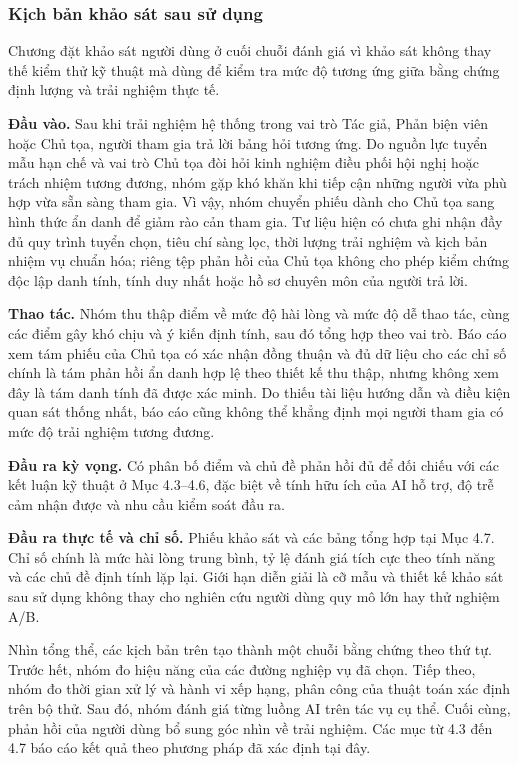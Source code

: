 \subsubsection{Kịch bản khảo sát sau sử dụng}

Chương đặt khảo sát người dùng ở cuối chuỗi đánh giá vì khảo sát không thay thế kiểm thử kỹ thuật mà dùng để kiểm tra mức độ tương ứng giữa bằng chứng định lượng và trải nghiệm thực tế.

\textbf{Đầu vào.} Sau khi trải nghiệm hệ thống trong vai trò Tác giả, Phản biện viên hoặc Chủ tọa, người tham gia trả lời bảng hỏi tương ứng. Do nguồn lực tuyển mẫu hạn chế và vai trò Chủ tọa đòi hỏi kinh nghiệm điều phối hội nghị hoặc trách nhiệm tương đương, nhóm gặp khó khăn khi tiếp cận những người vừa phù hợp vừa sẵn sàng tham gia. Vì vậy, nhóm chuyển phiếu dành cho Chủ tọa sang hình thức ẩn danh để giảm rào cản tham gia. Tư liệu hiện có chưa ghi nhận đầy đủ quy trình tuyển chọn, tiêu chí sàng lọc, thời lượng trải nghiệm và kịch bản nhiệm vụ chuẩn hóa; riêng tệp phản hồi của Chủ tọa không cho phép kiểm chứng độc lập danh tính, tính duy nhất hoặc hồ sơ chuyên môn của người trả lời.

\textbf{Thao tác.} Nhóm thu thập điểm về mức độ hài lòng và mức độ dễ thao tác, cùng các điểm gây khó chịu và ý kiến định tính, sau đó tổng hợp theo vai trò. Báo cáo xem tám phiếu của Chủ tọa có xác nhận đồng thuận và đủ dữ liệu cho các chỉ số chính là tám phản hồi ẩn danh hợp lệ theo thiết kế thu thập, nhưng không xem đây là tám danh tính đã được xác minh. Do thiếu tài liệu hướng dẫn và điều kiện quan sát thống nhất, báo cáo cũng không thể khẳng định mọi người tham gia có mức độ trải nghiệm tương đương.

\textbf{Đầu ra kỳ vọng.} Có phân bố điểm và chủ đề phản hồi đủ để đối chiếu với các kết luận kỹ thuật ở Mục 4.3--4.6, đặc biệt về tính hữu ích của AI hỗ trợ, độ trễ cảm nhận được và nhu cầu kiểm soát đầu ra.

\textbf{Đầu ra thực tế và chỉ số.} Phiếu khảo sát và các bảng tổng hợp tại Mục 4.7. Chỉ số chính là mức hài lòng trung bình, tỷ lệ đánh giá tích cực theo tính năng và các chủ đề định tính lặp lại. Giới hạn diễn giải là cỡ mẫu và thiết kế khảo sát sau sử dụng không thay cho nghiên cứu người dùng quy mô lớn hay thử nghiệm A/B.

Nhìn tổng thể, các kịch bản trên tạo thành một chuỗi bằng chứng theo thứ tự. Trước hết, nhóm đo hiệu năng của các đường nghiệp vụ đã chọn. Tiếp theo, nhóm đo thời gian xử lý và hành vi xếp hạng, phân công của thuật toán xác định trên bộ thử. Sau đó, nhóm đánh giá từng luồng AI trên tác vụ cụ thể. Cuối cùng, phản hồi của người dùng bổ sung góc nhìn về trải nghiệm. Các mục từ 4.3 đến 4.7 báo cáo kết quả theo phương pháp đã xác định tại đây.

